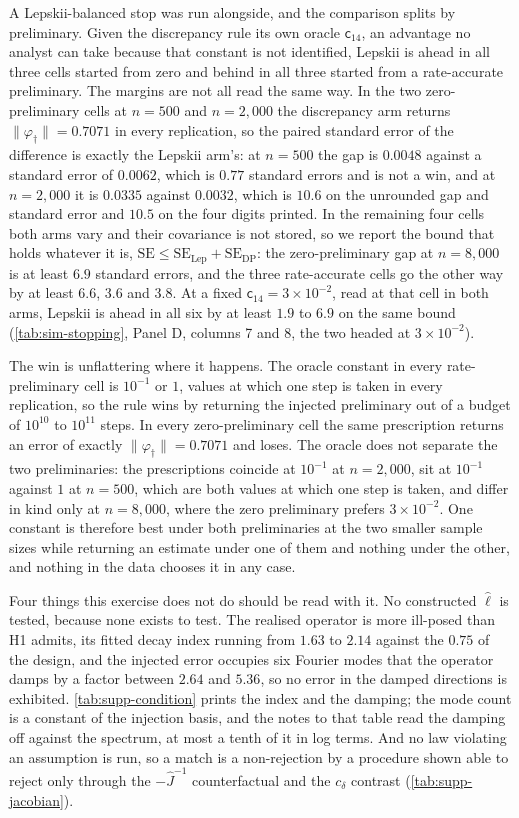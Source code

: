 \documentclass[
  12pt]{article}
\newcommand{\1}[1]{\mathds{1}\left[#1\right]}
\theoremstyle{plain}
\theoremstyle{definition}
\theoremstyle{definition}
\theoremstyle{remark}
\newcommand{\vdagger}{\varphi_{\dagger}}
\begin{document}
A Lepskii-balanced stop was run alongside, and the comparison splits by
preliminary. Given the discrepancy rule its own oracle $\mathsf c_{14}$, an
advantage no analyst can take because that constant is not identified, Lepskii
is ahead in all three cells started from zero and behind in all three started
from a rate-accurate preliminary. The margins are not all read the same way. In
the two zero-preliminary cells at $n=500$ and $n=2{,}000$ the discrepancy arm
returns $\|\vdagger\|=0.7071$ in every replication, so the paired standard error
of the difference is exactly the Lepskii arm's: at $n=500$ the gap is $0.0048$
against a standard error of $0.0062$, which is $0.77$ standard errors and is not
a win, and at $n=2{,}000$ it is $0.0335$ against $0.0032$, which is $10.6$ on the
unrounded gap and standard error and $10.5$ on the four digits printed. In
the remaining four cells both arms vary and their covariance is not stored, so
we report the bound that holds whatever it is,
$\mathrm{SE}\le\mathrm{SE}_{\mathrm{Lep}}+\mathrm{SE}_{\mathrm{DP}}$: the
zero-preliminary gap at $n=8{,}000$ is at least $6.9$ standard errors, and the
three rate-accurate cells go the other way by at least $6.6$, $3.6$ and $3.8$.
At a fixed $\mathsf c_{14}=3\times10^{-2}$, read at that cell in both arms,
Lepskii is ahead in all six by at least $1.9$ to $6.9$ on the same bound
(\cref{tab:sim-stopping}, Panel D, columns 7 and 8, the two headed at
$3\times10^{-2}$).

The win is unflattering where it happens. The oracle constant in every
rate-preliminary cell is $10^{-1}$ or $1$, values at which one step is taken in
every replication, so the rule wins by returning the injected preliminary out of
a budget of $10^{10}$ to $10^{11}$ steps. In every zero-preliminary cell the same
prescription returns an error of exactly $\|\vdagger\|=0.7071$ and loses. The
oracle does not separate the two preliminaries: the prescriptions coincide at
$10^{-1}$ at $n=2{,}000$, sit at $10^{-1}$ against $1$ at $n=500$, which are both
values at which one step is taken, and differ in kind only at $n=8{,}000$, where
the zero preliminary prefers $3\times10^{-2}$. One constant is therefore best
under both preliminaries at the two smaller sample sizes while returning an
estimate under one of them and nothing under the other, and nothing in the data
chooses it in any case.

Four things this exercise does not do should be read with it. No constructed
$\hat\ell$ is tested, because none exists to test. The realised operator is more
ill-posed than H1 admits, its fitted decay index running from $1.63$ to $2.14$
against the $0.75$ of the design, and the injected error occupies six Fourier
modes that the operator damps by a factor between $2.64$ and $5.36$, so no error
in the damped directions is exhibited. \cref{tab:supp-condition} prints the
index and the damping; the mode count is a constant of the injection basis, and
the notes to that table read the damping off against the spectrum, at most a
tenth of it in log terms. And no law violating an assumption is
run, so a match is a non-rejection by a procedure shown able to reject only
through the $-\hat J^{-1}$ counterfactual and the $c_\delta$ contrast (\cref{tab:supp-jacobian}).
\end{document}

